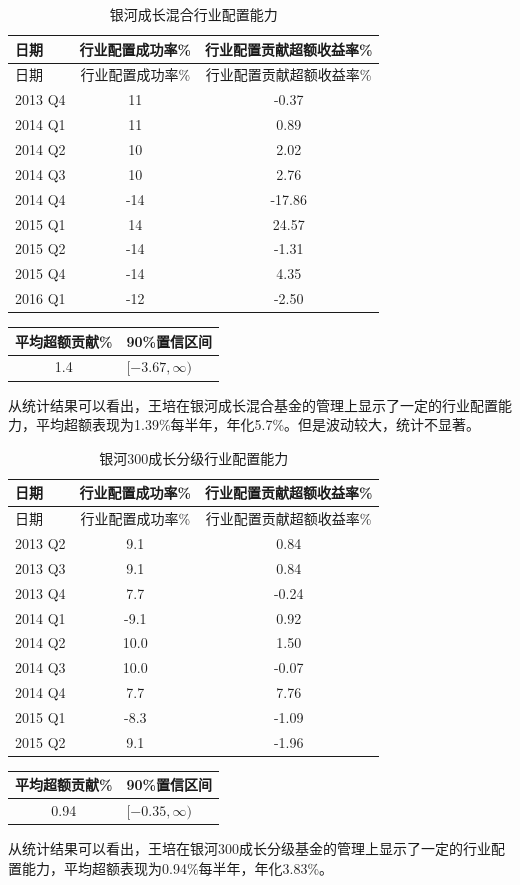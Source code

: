 \documentclass[hyperref,]{ctexart}
\begin{document}
\begin{longtable}[]{@{}lcc@{}}
\caption{银河成长混合行业配置能力}\tabularnewline
\toprule
日期 & 行业配置成功率\% & 行业配置贡献超额收益率\%\tabularnewline
\midrule
\endfirsthead
\toprule
日期 & 行业配置成功率\% & 行业配置贡献超额收益率\%\tabularnewline
\midrule
\endhead
2013 Q4 & 11 & -0.37\tabularnewline
2014 Q1 & 11 & 0.89\tabularnewline
2014 Q2 & 10 & 2.02\tabularnewline
2014 Q3 & 10 & 2.76\tabularnewline
2014 Q4 & -14 & -17.86\tabularnewline
2015 Q1 & 14 & 24.57\tabularnewline
2015 Q2 & -14 & -1.31\tabularnewline
2015 Q4 & -14 & 4.35\tabularnewline
2016 Q1 & -12 & -2.50\tabularnewline
\bottomrule
\end{longtable}

\begin{longtable}[]{@{}cl@{}}
\toprule
平均超额贡献\% & 90\%置信区间\tabularnewline
\midrule
\endhead
1.4 & \([-3.67,\infty)\)\tabularnewline
\bottomrule
\end{longtable}

从统计结果可以看出，王培在银河成长混合基金的管理上显示了一定的行业配置能力，平均超额表现为1.39\%每半年，年化5.7\%。但是波动较大，统计不显著。

\begin{longtable}[]{@{}lcc@{}}
\caption{银河300成长分级行业配置能力}\tabularnewline
\toprule
日期 & 行业配置成功率\% & 行业配置贡献超额收益率\%\tabularnewline
\midrule
\endfirsthead
\toprule
日期 & 行业配置成功率\% & 行业配置贡献超额收益率\%\tabularnewline
\midrule
\endhead
2013 Q2 & 9.1 & 0.84\tabularnewline
2013 Q3 & 9.1 & 0.84\tabularnewline
2013 Q4 & 7.7 & -0.24\tabularnewline
2014 Q1 & -9.1 & 0.92\tabularnewline
2014 Q2 & 10.0 & 1.50\tabularnewline
2014 Q3 & 10.0 & -0.07\tabularnewline
2014 Q4 & 7.7 & 7.76\tabularnewline
2015 Q1 & -8.3 & -1.09\tabularnewline
2015 Q2 & 9.1 & -1.96\tabularnewline
\bottomrule
\end{longtable}

\begin{longtable}[]{@{}cl@{}}
\toprule
平均超额贡献\% & 90\%置信区间\tabularnewline
\midrule
\endhead
0.94 & \([-0.35,\infty)\)\tabularnewline
\bottomrule
\end{longtable}

从统计结果可以看出，王培在银河300成长分级基金的管理上显示了一定的行业配置能力，平均超额表现为0.94\%每半年，年化3.83\%。
\end{document}
